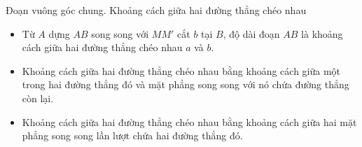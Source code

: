 \begin{dang}{Đoạn vuông góc chung. Khoảng cách giữa hai đường thẳng chéo nhau}
\begin{itemize}
{
		}
		\begin{itemize}
		\item [$\bullet$] Từ $A$ dựng $AB$ song song với $MM'$ cắt $b$ tại $B$, độ dài đoạn $AB$ là khoảng cách giữa hai đường thẳng chéo nhau $a$ và $b$.
	\end{itemize}
	\end{itemize}
	\begin{luuy}
		\begin{itemize}
			\item Khoảng cách giữa hai đường thẳng chéo nhau bằng khoảng cách giữa một trong hai đường thẳng đó và mặt phẳng song song với nó chứa đường thẳng còn lại.
			\item Khoảng cách giữa hai đường thẳng chéo nhau bằng khoảng cách giữa hai mặt phẳng song song lần lượt chứa hai đường thẳng đó.
		\end{itemize}
	\end{luuy}
\end{dang}

